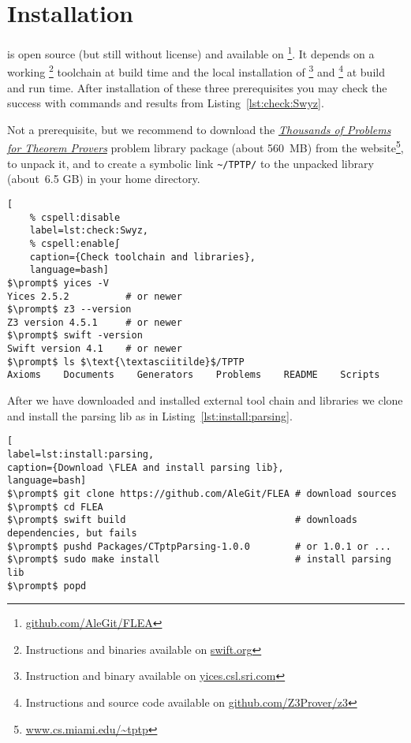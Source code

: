 \section{Installation}\label{sec:flea:installation}

\FLEA{} is open source (but still without license) and available on \GitHub\footnote{
	\href{https://github.com/AleGit/FLEA}{github.com/AleGit/FLEA}
}. It depends on a working \Swift\footnote{
	Instructions and binaries available on \href{https://swift.org}{swift.org}
} toolchain at build time and the local installation of
\Yices\footnote{
	Instruction and binary available on \href{http://yices.csl.sri.com}{yices.csl.sri.com}
}
and \Ziii\footnote{
	Instructions and source code available on \href{https://github.com/Z3Prover/z3}{github.com/Z3Prover/z3}
} at build and run time. After installation of these three prerequisites you may check the success with commands and results from Listing~\ref{lst:check:Swyz}.

Not a prerequisite, but we recommend to download
the \href{http://www.cs.miami.edu/~tptp/}{\emph{Thousands of Problems for Theorem Provers}} problem library package (about 560~MB)
from the \TPTP{} website\footnote{
	\href{http://www.cs.miami.edu/~tptp/}{www.cs.miami.edu/\textasciitilde tptp}
}, to unpack it, and to create a symbolic link \verb+~/TPTP/+{} to the unpacked library (about~6.5 GB) in your home directory.
\begin{lstlisting}[
	% cspell:disable
	label=lst:check:Swyz,
	% cspell:enable∫
	caption={Check toolchain and libraries},
	language=bash]
$\prompt$ yices -V
Yices 2.5.2          # or newer
$\prompt$ z3 --version
Z3 version 4.5.1     # or newer
$\prompt$ swift -version
Swift version 4.1    # or newer
$\prompt$ ls $\text{\textasciitilde}$/TPTP
Axioms    Documents    Generators    Problems    README    Scripts
\end{lstlisting}

After we have downloaded and installed external tool chain and libraries we clone \FLEA{} and install the parsing lib as in Listing~\ref{lst:install:parsing}.

\begin{lstlisting}[
label=lst:install:parsing,
caption={Download \FLEA and install parsing lib},
language=bash]
$\prompt$ git clone https://github.com/AleGit/FLEA # download sources
$\prompt$ cd FLEA
$\prompt$ swift build                              # downloads dependencies, but fails
$\prompt$ pushd Packages/CTptpParsing-1.0.0        # or 1.0.1 or ...
$\prompt$ sudo make install                        # install parsing lib
$\prompt$ popd
\end{lstlisting}

